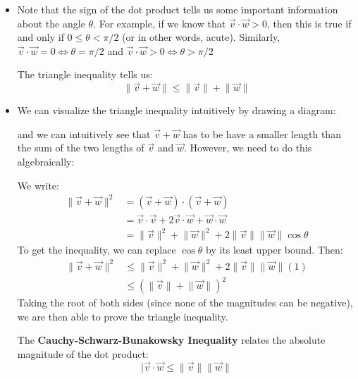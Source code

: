 \begin{itemize}
    \item Note that the sign of the dot product tells us some important information about the angle $\theta$. For example, if we know that $\vec{v}\cdot\vec{w}>0$, then this is true if and only if $0 \le \theta < \pi/2$ (or in other words, acute). Similarly, $\vec{v}\cdot\vec{w}=0 \iff \theta=\pi/2$ and $\vec{v}\cdot\vec{w}>0 \iff \theta>\pi/2$
    \begin{theorem}
        The triangle inequality tells us:
        \begin{equation}
            \lVert \vec{v}+\vec{w} \rVert \le \lVert \vec{v} \rVert + \lVert \vec{w} \rVert
            \label{eq:}
        \end{equation}
    \end{theorem}
    \item We can visualize the triangle inequality intuitively by drawing a diagram:
    \begin{center}
    \end{center}
    and we can intuitively see that $\vec{v}+\vec{w}$ has to be have a smaller length than the sum of the two lengths of $\vec{v}$ and $\vec{w}$. However, we need to do this algebraically:
    \begin{prooof}
        We write:
        \begin{align}
            \lVert \vec{v}+\vec{w} \rVert ^2 &= (\vec{v}+\vec{w})\cdot(\vec{v}+\vec{w}) \\
            &= \vec{v}\cdot\vec{v} + 2\vec{v}\cdot\vec{w}+\vec{w}\cdot\vec{w} \\ 
            &= \lVert \vec{v}\rVert^2+ \lVert \vec{w} \rVert^2+2\lVert\vec{v}\rVert\lVert\vec{w}\rVert\cos\theta
        \end{align}
        To get the inequality, we can replace $\cos\theta$ by its least upper bound. Then:
        \begin{align}
            \lVert \vec{v}+\vec{w} \rVert^2 &\le \lVert \vec{v} \rVert^2+\lVert \vec{w} \rVert^2+2\lVert\vec{v}\rVert\lVert\vec{w}\rVert (1) \\
            &\le \left(\lVert\vec{v}\rVert+\lVert\vec{w}\rVert\right)^2
        \end{align}
        Taking the root of both sides (since none of the magnitudes can be negative), we are then able to prove the triangle inequality.
    \end{prooof}
    \begin{theorem}
        The \textbf{Cauchy-Schwarz-Bunakowsky Inequality} relates the absolute magnitude of the dot product:
        \begin{equation}
            |\vec{v}\cdot\vec{w} \le \lVert\vec{v}\rVert\lVert\vec{w}\rVert
            \label{eq:}
        \end{equation}
        

\end{theorem}
\end{itemize}

